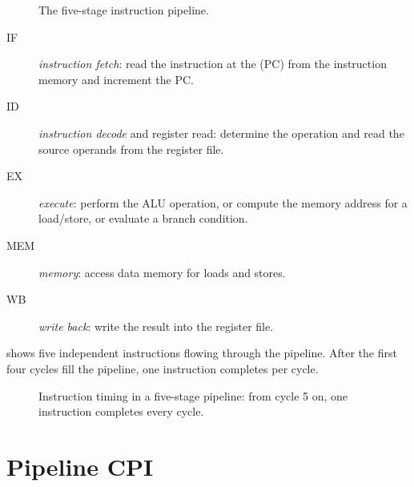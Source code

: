 \documentclass[../main.tex]{subfiles}
\begin{document}
\begin{figure}[htbp]
  \centering
  
  \caption{The five-stage instruction pipeline.}
  \label{fig:stages}
\end{figure}

\begin{description}
  \item[IF] \emph{instruction fetch}: read the instruction at the
     (PC) from the instruction memory and increment the PC.
  \item[ID] \emph{instruction decode} and register read: determine the
    operation and read the source operands from the register file.
  \item[EX] \emph{execute}: perform the ALU operation, or compute the
    memory address for a load/store, or evaluate a branch condition.
  \item[MEM] \emph{memory}: access data memory for loads and
    stores.
  \item[WB] \emph{write back}: write the result into the register file.
\end{description}

 shows five independent instructions flowing through the
pipeline.  After the first four cycles fill the pipeline, one instruction
completes per cycle.

\begin{figure}[htbp]
  \centering
  
  \caption{Instruction timing in a five-stage pipeline: from cycle 5 on, one
    instruction completes every cycle.}
  \label{fig:timing}
\end{figure}

\section{Pipeline CPI}
\end{document}
